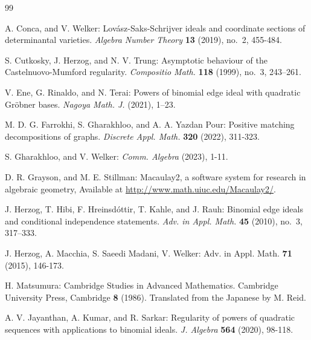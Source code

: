 \documentclass[11pt,a4paper,reqno]{amsart}
\theoremstyle{definition}
\numberwithin{equation}{section}
\begin{document}
\begin{thebibliography}{99}
{ A. Conca, and V. Welker: \newblock Lov\'{a}sz-{S}aks-{S}chrijver ideals and coordinate sections of determinantal varieties. \emph{Algebra Number Theory} {\bf 13} (2019), {no.~2}, {455-484}. 


 S. Cutkosky, J. Herzog, and N. V. Trung: \newblock Asymptotic behaviour of the Castelnuovo-Mumford regularity. \emph{Compositio Math.} {\bf 118} (1999), no.~3, 243–261.


  V. Ene, G. Rinaldo, and N. Terai: Powers of binomial edge ideal with quadratic Gr\"{o}bner bases. \emph{Nagoya Math. J.} (2021), 1–23. 

 M. D. G. Farrokhi, S. Gharakhloo, and A. A. Yazdan Pour: \newblock Positive matching decompositions of graphs. \emph{Discrete Appl. Math.} {\bf 320} (2022), 311-323. 




 S. Gharakhloo, and V. Welker:  \emph{Comm. Algebra} (2023), {1-11}.

 D. R. Grayson, and M. E. Stillman: Macaulay2, a software system for research in algebraic geometry, Available at \url{http://www.math.uiuc.edu/Macaulay2/}.

 J. Herzog, T. Hibi, F. Hreinsd\'{o}ttir, T. Kahle, and J. Rauh: Binomial edge ideals and conditional independence statements. \emph{Adv. in Appl. Math.} {\bf 45} (2010), no.~3, 317–333.

 J. Herzog, A. Macchia, S. Saeedi Madani, V. Welker:  {Adv. in Appl. Math.} {\bf 71} (2015), 146-173.



 H. Matsumura:  {Cambridge Studies in Advanced Mathematics.} {Cambridge University Press, Cambridge} {\bf 8} (1986). {Translated from the Japanese by M. Reid.}




 A. V. Jayanthan,  A. Kumar, and  R. Sarkar: \newblock Regularity of powers of quadratic sequences with applications to binomial ideals. \emph{J. Algebra} {\bf 564} (2020),  {98-118}.



}
\end{thebibliography}
\end{document}
